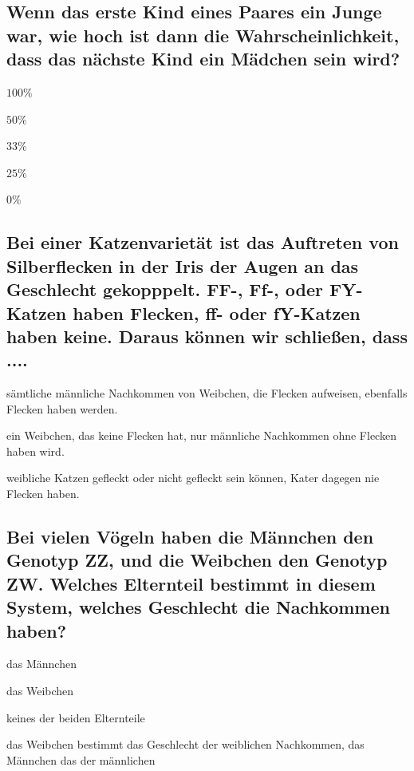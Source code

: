 \documentclass{article}
\begin{document}
\subsection*{Wenn das erste Kind eines Paares ein Junge war, wie hoch ist dann die
Wahrscheinlichkeit, dass das nächste Kind ein Mädchen sein wird?}
\begin{todolist}%
\item $100\%$
\item $50\%$   
\item $33\%$
\item $25\%$
\item $0\%$
\end{todolist}
\subsection*{Bei einer Katzenvarietät ist das Auftreten von Silberflecken in der Iris der
Augen an das Geschlecht gekopppelt. FF-, Ff-, oder FY-Katzen haben
Flecken, ff- oder fY-Katzen haben keine. Daraus können wir schließen,
dass ....}
\begin{todolist}%
\item sämtliche männliche Nachkommen von Weibchen, die Flecken
aufweisen, ebenfalls Flecken haben werden.  
\item ein Weibchen, das keine Flecken hat, nur männliche
Nachkommen ohne Flecken haben wird.
\item weibliche Katzen gefleckt oder nicht gefleckt sein können, Kater
dagegen nie Flecken haben.  
\end{todolist}
\subsection*{Bei vielen Vögeln haben die Männchen den Genotyp ZZ, und die
Weibchen den Genotyp ZW. Welches Elternteil bestimmt in diesem
System, welches Geschlecht die Nachkommen haben?}
\begin{todolist}%
\item das Männchen
\item das Weibchen  
\item keines der beiden Elternteile
\item das Weibchen bestimmt das Geschlecht der weiblichen
Nachkommen, das Männchen das der männlichen
\end{todolist}
\end{document}
